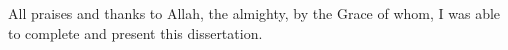 
\begin{acknowledgements}      

All praises and thanks to Allah, the almighty, by the Grace of whom, I was able to complete and present this dissertation.

\end{acknowledgements}
